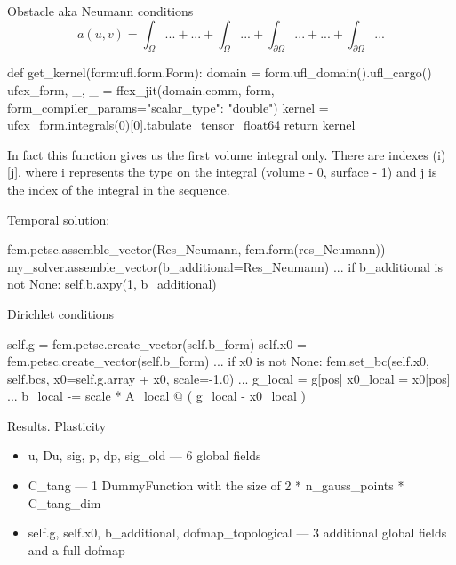 \documentclass[9pt]{beamer}
\begin{document}
\begin{frame}[fragile]{Obstacle aka Neumann conditions}
  \begin{equation}
    a(u,v) = \int_\Omega... + ... + \int_\Omega... + \int_{\partial\Omega}... + ... + \int_{\partial\Omega}...
  \end{equation}
  \begin{pythoncode}
    def get_kernel(form:ufl.form.Form):
      domain = form.ufl_domain().ufl_cargo()
      ufcx_form, _, _ = ffcx_jit(domain.comm, form, form_compiler_params={"scalar_type": "double"})
      kernel = ufcx_form.integrals(0)[0].tabulate_tensor_float64
      return kernel
  \end{pythoncode}
  In fact this function gives us the first volume integral only. There are indexes (i)[j], where i represents the type on the integral (volume - 0, surface - 1) and j is the index of the integral in the sequence.

  Temporal solution:
  \begin{pythoncode}
    fem.petsc.assemble_vector(Res_Neumann, fem.form(res_Neumann))
    my_solver.assemble_vector(b_additional=Res_Neumann)
    ...
    if b_additional is not None:
    self.b.axpy(1, b_additional)
  \end{pythoncode}

\end{frame}

\begin{frame}[fragile]{Dirichlet conditions}
  \begin{pythoncode}
    self.g = fem.petsc.create_vector(self.b_form)
    self.x0 = fem.petsc.create_vector(self.b_form)
    ...
    if x0 is not None:
      fem.set_bc(self.x0, self.bcs, x0=self.g.array + x0, scale=-1.0)
    ...
    g_local = g[pos]
    x0_local = x0[pos]
    ...
    b_local -= scale * A_local @ ( g_local - x0_local )
  \end{pythoncode}
\end{frame}

\begin{frame}{Results. Plasticity}
  \begin{itemize}
    \item u, Du, sig, p, dp, sig\_old --- 6 global fields
    \item C\_tang --- 1 DummyFunction with the size of 2 * n\_gauss\_points * C\_tang\_dim 
    \item self.g, self.x0, b\_additional, dofmap\_topological --- 3 additional global fields and a full dofmap
  \end{itemize} 

\end{frame}
\end{document}
